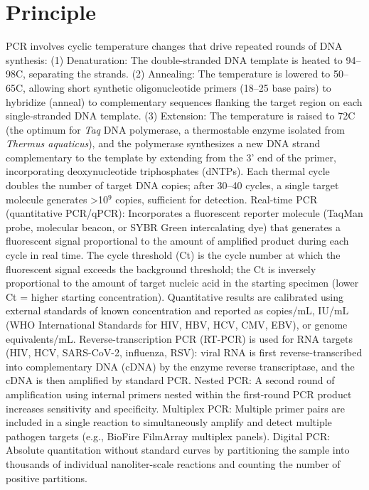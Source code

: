 \section*{Principle}
PCR involves cyclic temperature changes that drive repeated rounds of DNA synthesis: (1) Denaturation: The double-stranded DNA template is heated to 94--98\textdegree{}C, separating the strands. (2) Annealing: The temperature is lowered to 50--65\textdegree{}C, allowing short synthetic oligonucleotide primers (18--25 base pairs) to hybridize (anneal) to complementary sequences flanking the target region on each single-stranded DNA template. (3) Extension: The temperature is raised to 72\textdegree{}C (the optimum for \textit{Taq} DNA polymerase, a thermostable enzyme isolated from \textit{Thermus aquaticus}), and the polymerase synthesizes a new DNA strand complementary to the template by extending from the 3' end of the primer, incorporating deoxynucleotide triphosphates (dNTPs). Each thermal cycle doubles the number of target DNA copies; after 30--40 cycles, a single target molecule generates >10$^9$ copies, sufficient for detection. Real-time PCR (quantitative PCR/qPCR): Incorporates a fluorescent reporter molecule (TaqMan probe, molecular beacon, or SYBR Green intercalating dye) that generates a fluorescent signal proportional to the amount of amplified product during each cycle in real time. The cycle threshold (Ct) is the cycle number at which the fluorescent signal exceeds the background threshold; the Ct is inversely proportional to the amount of target nucleic acid in the starting specimen (lower Ct = higher starting concentration). Quantitative results are calibrated using external standards of known concentration and reported as copies/mL, IU/mL (WHO International Standards for HIV, HBV, HCV, CMV, EBV), or genome equivalents/mL. Reverse-transcription PCR (RT-PCR) is used for RNA targets (HIV, HCV, SARS-CoV-2, influenza, RSV): viral RNA is first reverse-transcribed into complementary DNA (cDNA) by the enzyme reverse transcriptase, and the cDNA is then amplified by standard PCR. Nested PCR: A second round of amplification using internal primers nested within the first-round PCR product increases sensitivity and specificity. Multiplex PCR: Multiple primer pairs are included in a single reaction to simultaneously amplify and detect multiple pathogen targets (e.g., BioFire FilmArray multiplex panels). Digital PCR: Absolute quantitation without standard curves by partitioning the sample into thousands of individual nanoliter-scale reactions and counting the number of positive partitions.


